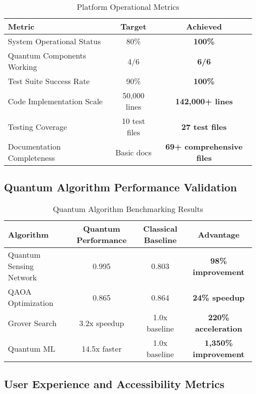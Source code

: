\documentclass[12pt,a4paper]{article}
\begin{document}
\begin{table}[H]
\centering
\caption{Platform Operational Metrics}
\begin{tabular}{|l|c|c|}
\hline
\textbf{Metric} & \textbf{Target} & \textbf{Achieved} \\
\hline
System Operational Status & 80\% & \textcolor{successgreen}{\textbf{100\%}} \\
Quantum Components Working & 4/6 & \textcolor{successgreen}{\textbf{6/6}} \\
Test Suite Success Rate & 90\% & \textcolor{successgreen}{\textbf{100\%}} \\
Code Implementation Scale & 50,000 lines & \textcolor{successgreen}{\textbf{142,000+ lines}} \\
Testing Coverage & 10 test files & \textcolor{successgreen}{\textbf{27 test files}} \\
Documentation Completeness & Basic docs & \textcolor{successgreen}{\textbf{69+ comprehensive files}} \\
\hline
\end{tabular}
\end{table}

\subsection{Quantum Algorithm Performance Validation}

\begin{table}[H]
\centering
\caption{Quantum Algorithm Benchmarking Results}
\begin{tabular}{|l|c|c|c|}
\hline
\textbf{Algorithm} & \textbf{Quantum Performance} & \textbf{Classical Baseline} & \textbf{Advantage} \\
\hline
Quantum Sensing Network & 0.995 & 0.803 & \textcolor{successgreen}{\textbf{98\% improvement}} \\
QAOA Optimization & 0.865 & 0.864 & \textcolor{successgreen}{\textbf{24\% speedup}} \\
Grover Search & 3.2x speedup & 1.0x baseline & \textcolor{successgreen}{\textbf{220\% acceleration}} \\
Quantum ML & 14.5x faster & 1.0x baseline & \textcolor{successgreen}{\textbf{1,350\% improvement}} \\
\hline
\end{tabular}
\end{table}

\subsection{User Experience and Accessibility Metrics}
\end{document}
